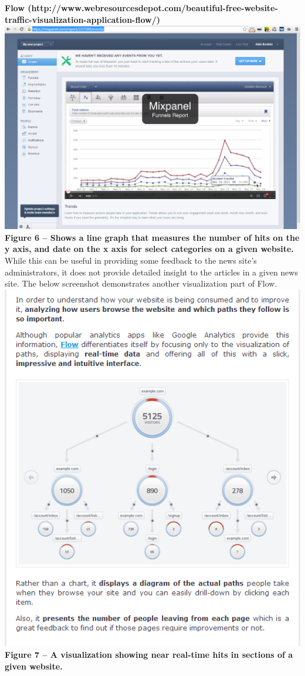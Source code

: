 \documentclass[12pt]{article}
\begin{document}
\noindent\textbf{Flow (http://www.webresourcesdepot.com/beautiful-free-website-traffic-visualization-application-flow/)} \\
\noindent\includegraphics[scale=0.45]{img/flow}
\noindent\textbf{Figure 6 -- Shows a line graph that measures the number of hits on the y axis, and date on the x axis for select categories on a given website.} \\

While this can be useful in providing some feedback to the news site's administrators, it does not provide detailed insight to the articles in a given news site. The below screenshot demonstrates another visualization part of Flow. \\
\noindent\includegraphics[scale=1]{img/flow1}
\noindent\textbf{Figure 7 -- A visualization showing near real-time hits in sections of a given website.} \\
\end{document}
